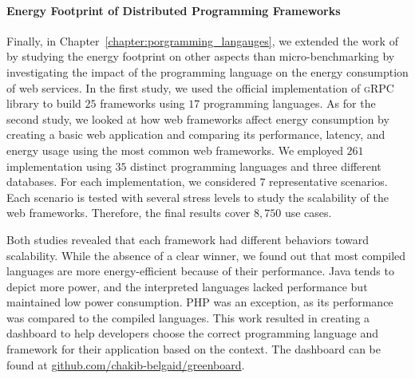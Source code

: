 \paragraph*{Energy Footprint of Distributed Programming Frameworks}
Finally, in Chapter~\ref{chapter:porgramming_langauges}, we extended the work of \citeauthor{pereira_energy_2017}~\cite{pereira_energy_2017} by studying the energy footprint on other aspects than micro-benchmarking by investigating the impact of the programming language on the energy consumption of web services. 
In the first study, we used the official implementation of \textsc{gRPC} library to build $25$ frameworks using $17$ programming languages. 
As for the second study, we looked at how web frameworks affect energy consumption by creating a basic web application and comparing its performance, latency, and energy usage using the most common web frameworks.
We employed $261$ implementation using $35$ distinct programming languages and three different databases.
For each implementation, we considered $7$ representative scenarios.
Each scenario is tested with several stress levels to study the scalability of the web frameworks.
Therefore, the final results cover $8,750$ use cases.

Both studies revealed that each framework had different behaviors toward scalability.
While the absence of a clear winner, we found out that most compiled languages are more energy-efficient because of their performance.
Java tends to depict more power, and the interpreted languages lacked performance but maintained low power consumption.
PHP was an exception, as its performance was compared to the compiled languages. 
This work resulted in creating a dashboard to help developers choose the correct programming language and framework for their application based on the context.
The dashboard can be found at \url{github.com/chakib-belgaid/greenboard}.




